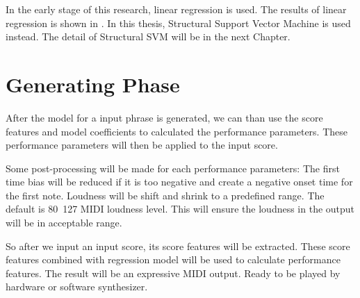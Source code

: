    In the early stage of this research, linear regression is used. The results of linear regression is shown in \cite{Lyu2012}. In this thesis, Structural Support Vector Machine\cite{Joachims2009} is used instead. The detail of Structural SVM will be in the next Chapter.
   \section{Generating Phase}
      After the model for a input phrase is generated, we can than use the score features and model coefficients to calculated the performance parameters. These performance parameters will then be applied to the input score.
      
      Some post-processing will be made for each performance parameters: The first time bias will be reduced if it is too negative and create a negative onset time for the first note. Loudness will be shift and shrink to a predefined range. The default is 80~127 MIDI loudness level. This will ensure the loudness in the output will be in acceptable range. 
      
 So after we input an input score, its score features will be extracted. These score features combined with regression model will be used to calculate performance features. The result will be an expressive MIDI output. Ready to be played by hardware or software synthesizer.  
   
